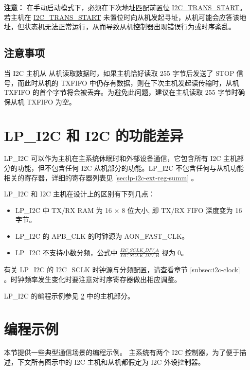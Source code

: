 \documentclass[main\_\_CN.tex]{subfiles}
\begin{document}
{\bfseries 注意：}
在手动启动模式下，必须在下次地址匹配前置位 \hyperref[fielddesc:I2CTRANSSTART]{I2C\_TRANS\_START}。
若主机在 \hyperref[fielddesc:I2CTRANSSTART]{I2C\_TRANS\_START} 未置位时向从机发起寻址，从机可能会应答该地址，但状态机无法正常运行，从而导致从机控制器出现错误行为或时序紊乱。

\subsection{注意事项}


\begin{tiplisting}
当 I2C 主机从 \chipname{} 从机读取数据时，如果主机恰好读取 255 字节后发送了 STOP 信号，而此时从机的 TXFIFO 中仍存有数据，则在下次主机发起读传输时，从机 TXFIFO 的首个字节将会被丢弃。为避免此问题，建议在主机读取 255 字节时确保从机 TXFIFO 为空。

\end{tiplisting}


\section{LP\_I2C 和 I2C 的功能差异}\label{sec:i2c-hplp-diff}

LP\_I2C 可以作为主机在主系统休眠时和外部设备通信，它包含所有 I2C 主机部分的功能，但不包含任何 \chipname{} I2C 从机部分的功能。LP\_I2C 不包含任何与从机功能相关的寄存器，详细的寄存器列表见 \ref{sec:lp-i2c-ext-reg-summ} 。

LP\_I2C 和 I2C 主机在设计上的区别有下列几点：

\begin{itemize}
    \item LP\_I2C 中 TX/RX RAM 为 16 × 8 位大小, 即 TX/RX FIFO 深度变为 16 字节。
    \item LP\_I2C 的 APB\_CLK 的时钟源为 AON\_FAST\_CLK。
    \item LP\_I2C 不支持小数分频，公式中 $\frac{I2C\_SCLK\_DIV\_A}{I2C\_SCLK\_DIV\_B}$ 视为 0。
\end{itemize}

有关 LP\_I2C 的 I2C\_SCLK 时钟源与分频配置，请查看章节 \ref{subsec:i2c-clock} \textit{}。时钟频率发生变化时要注意对时序寄存器做出相应调整。

LP\_I2C 的编程示例参见 \ref{subsec:i2c-prom-guide} 中的主机部分。

\section{编程示例}\label{subsec:i2c-prom-guide}
本节提供一些典型通信场景的编程示例。\chipname{} 主系统有两个 I2C 控制器，为了便于描述，下文所有图示中的 I2C 主机和从机都假定为 \chipname{} I2C 外设控制器。
\end{document}
